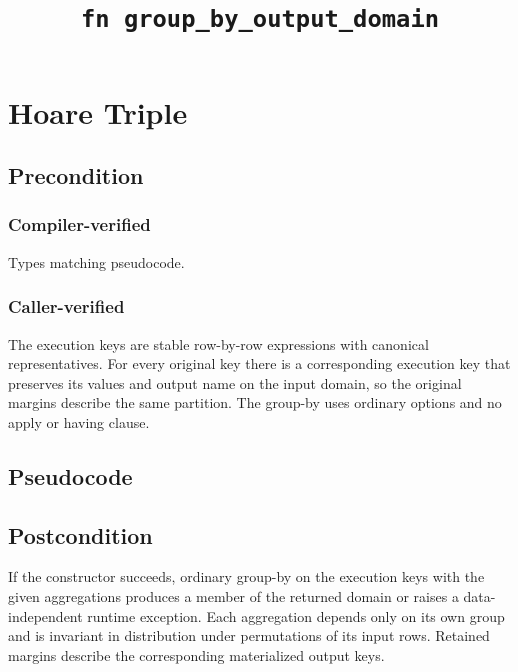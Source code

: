 \documentclass{article}
\title{\texttt{fn group\_by\_output\_domain}}
\author{\MichaelShoemateAuthor}
\begin{document}
\maketitle

\contrib

\section{Hoare Triple}
\subsection*{Precondition}
\subsubsection*{Compiler-verified}
Types matching pseudocode.

\subsubsection*{Caller-verified}
The execution keys are stable row-by-row expressions with canonical representatives.
For every original key there is a corresponding execution key that preserves its values
and output name on the input domain, so the original margins describe the same partition.
The group-by uses ordinary options and no apply or having clause.

\subsection*{Pseudocode}


\subsection*{Postcondition}
\begin{theorem}
If the constructor succeeds, ordinary group-by on the execution keys with the
given aggregations produces a member of the returned domain or raises a
data-independent runtime exception. Each aggregation depends only on its
own group and is invariant in distribution under permutations of its input rows.
Retained margins describe the corresponding materialized output keys.
\end{theorem}
\end{document}
